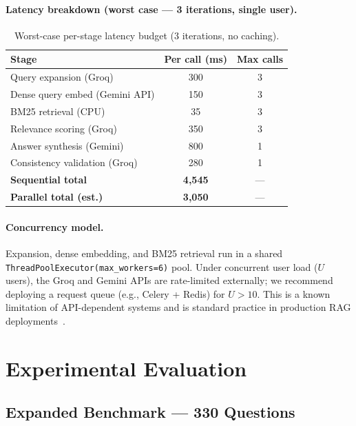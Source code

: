 \documentclass[12pt,a4paper]{article}
\begin{document}
\paragraph{Latency breakdown (worst case — 3 iterations, single user).}
\begin{table}[H]
\centering
\caption{Worst-case per-stage latency budget (3 iterations, no caching).}
\label{tab:latency}
\begin{tabular}{lcc}
\toprule
\textbf{Stage} & \textbf{Per call (ms)} & \textbf{Max calls} \\
\midrule
Query expansion (Groq)          & 300  & 3 \\
Dense query embed (Gemini API)  & 150  & 3 \\
BM25 retrieval (CPU)            & 35   & 3 \\
Relevance scoring (Groq)        & 350  & 3 \\
Answer synthesis (Gemini)       & 800  & 1 \\
Consistency validation (Groq)   & 280  & 1 \\
\midrule
\textbf{Sequential total}       & \textbf{4,545} & — \\
\textbf{Parallel total (est.)}  & \textbf{3,050} & — \\
\bottomrule
\end{tabular}
\end{table}

\paragraph{Concurrency model.} Expansion, dense embedding, and BM25 retrieval
run in a shared \texttt{ThreadPoolExecutor(max\_workers=6)} pool. Under concurrent
user load ($U$ users), the Groq and Gemini APIs are rate-limited externally;
we recommend deploying a request queue (e.g., Celery + Redis) for $U > 10$.
This is a known limitation of API-dependent systems and is standard practice in
production RAG deployments~\cite{shi2024scaling}.

\section{Experimental Evaluation}
\label{sec:experiments}

\subsection{Expanded Benchmark — 330 Questions}
\label{sec:benchmark}
\end{document}
